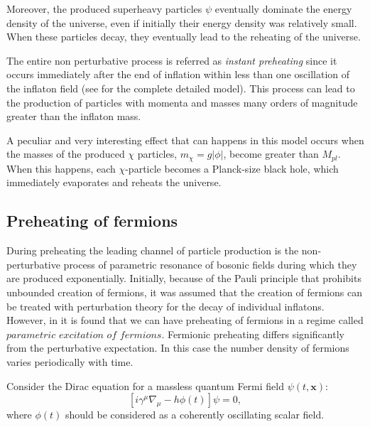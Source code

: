 \documentclass[11pt,a4paper,twoside]{book}
\begin{document}
Moreover, the produced superheavy particles $\psi$ eventually dominate the energy density of the universe, even if initially their energy density was relatively small. When these particles decay, they eventually lead to the reheating of the universe.

The entire non perturbative process is referred as \textit{instant preheating} since it occurs immediately after the end of inflation within less than one oscillation of the inflaton field (see \cite{Chap4:InstantPreheating} for the complete detailed model).  This process can lead to the production of particles with momenta and masses many orders of magnitude greater than the inflaton mass.

A peculiar and very interesting effect that can happens in this model occurs when the masses of the produced $\chi$ particles, $ m_{\chi}=g|\phi| $, become greater than $ M_{pl} $. When this happens, each $\chi$-particle becomes a Planck-size black hole, which immediately evaporates and reheats the universe.
\subsection{Preheating of fermions}
During preheating the leading channel of particle production is the non-perturbative process of parametric resonance of bosonic fields during which they are produced exponentially. Initially, because of the Pauli principle that prohibits unbounded creation of fermions, it was assumed that the creation of fermions can be treated with perturbation theory for the decay of individual inflatons. However, in \cite{Chap4:FermionPreheating} it is found that we can have preheating of fermions in a regime called $ \textit{parametric excitation of fermions} $. Fermionic preheating differs significantly from the perturbative expectation. In this case the number density of fermions varies periodically with time.

Consider the Dirac equation for a massless quantum Fermi field $\psi(t,\textbf{x})$:
\begin{equation}
\label{Chap4:OtherModels_DiracEquation}
[i\gamma^{\mu}\nabla_{\mu} - h\phi(t)]\psi = 0,
\end{equation}
where $\phi(t)$ should be considered as a coherently oscillating scalar field.
\end{document}

